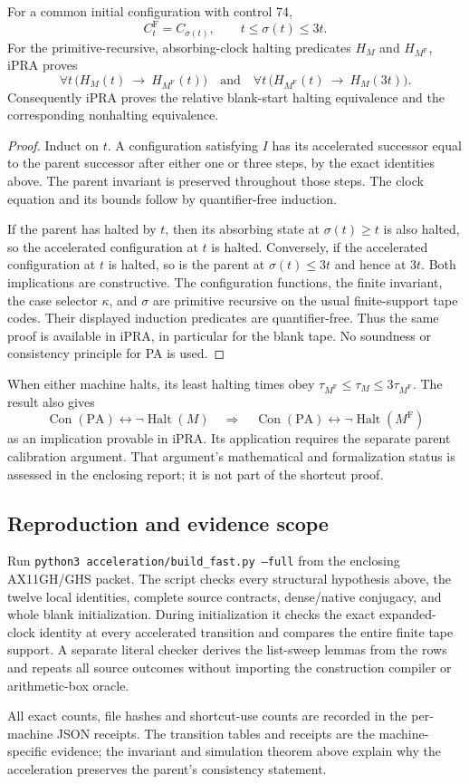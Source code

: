 \begin{theorem}
For a common initial configuration with control 74,
\[
 C_t^{\mathrm F}=C_{\sigma(t)},\qquad
 t\leq\sigma(t)\leq3t.
\]
For the primitive-recursive, absorbing-clock halting predicates $H_M$ and
$H_{M^{\mathrm F}}$, iPRA proves
\[
 \forall t\,\bigl(H_M(t)\ \longrightarrow\ H_{M^{\mathrm F}}(t)\bigr)
 \quad\text{and}\quad
 \forall t\,\bigl(H_{M^{\mathrm F}}(t)\ \longrightarrow\ H_M(3t)\bigr).
\]
Consequently iPRA proves the relative blank-start halting equivalence and
the corresponding nonhalting equivalence.
\end{theorem}
\begin{proof}
Induct on $t$. A configuration satisfying $I$ has its accelerated successor
equal to the parent successor after either one or three steps, by the exact
identities above. The parent invariant is preserved throughout those steps.
The clock equation and its bounds follow by quantifier-free induction.

If the parent has halted by $t$, then its absorbing state at $\sigma(t)\geq t$
is also halted, so the accelerated configuration at $t$ is halted. Conversely,
if the accelerated configuration at $t$ is halted, so is the parent at
$\sigma(t)\leq3t$ and hence at $3t$. Both implications are constructive.
The configuration functions, the finite invariant, the case selector
$\kappa$, and $\sigma$ are primitive recursive on the usual finite-support
tape codes. Their displayed induction predicates are quantifier-free.
Thus the same proof is available in iPRA, in particular for the blank tape.
No soundness or consistency principle for PA is used.
\end{proof}

When either machine halts, its least halting times obey
$\tau_{M^{\mathrm F}}\leq\tau_M\leq3\tau_{M^{\mathrm F}}$.
The result also gives
\[
 \operatorname{Con}(\mathrm{PA})\leftrightarrow\neg\operatorname{Halt}(M)
 \quad\Longrightarrow\quad
 \operatorname{Con}(\mathrm{PA})\leftrightarrow\neg\operatorname{Halt}(M^{\mathrm F})
\]
as an implication provable in iPRA. Its application requires the separate
parent calibration argument. That argument's mathematical and formalization
status is assessed in the enclosing report; it is not part of the shortcut proof.

\subsection{Reproduction and evidence scope}
Run \texttt{python3 acceleration/build\_fast.py --full} from the enclosing
AX11GH/GHS packet. The script checks every structural hypothesis above,
the twelve local identities, complete source contracts, dense/native
conjugacy, and whole blank initialization. During initialization it checks
the exact expanded-clock identity at every accelerated transition and
compares the entire finite tape support. A separate literal checker derives
the list-sweep lemmas from the rows and repeats all source outcomes without
importing the construction compiler or arithmetic-box oracle.

All exact counts, file hashes and shortcut-use counts are recorded in the
per-machine JSON receipts. The transition tables and receipts are the
machine-specific evidence; the invariant and simulation theorem above
explain why the acceleration preserves the parent's consistency statement.
